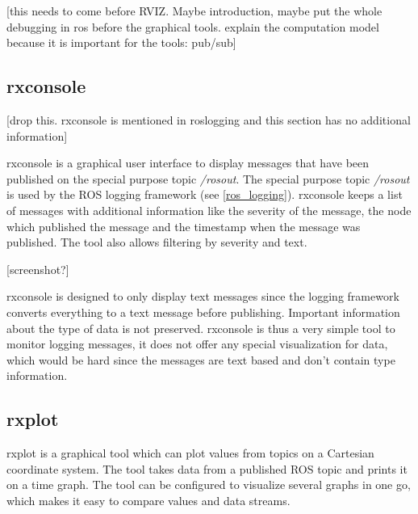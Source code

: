 [this needs to come before RVIZ. Maybe introduction, maybe put the whole debugging in ros before the graphical tools. explain the computation model because it is important for the tools: pub/sub]


\subsection{rxconsole}
[drop this. rxconsole is mentioned in roslogging and this section has no additional information]

rxconsole is a graphical user interface to display messages that have been published on the special purpose topic \emph{/rosout}. The special purpose topic \emph{/rosout} is used by the ROS logging framework (see \ref{ros_logging}). rxconsole keeps a list of messages with additional information like the severity of the message, the node which published the message and the timestamp when the message was published. The tool also allows filtering by severity and text.

[screenshot?]

rxconsole is designed to only display text messages since the logging framework converts everything to a text message before publishing. Important information about the type of data is not preserved. rxconsole is thus a very simple tool to monitor logging messages, it does not offer any special visualization for data, which would be hard since the messages are text based and don't contain type information.



\subsection{rxplot}
rxplot is a graphical tool which can plot values from topics on a Cartesian coordinate system. The tool takes data from a published ROS topic and prints it on a time graph. The tool can be configured to visualize several graphs in one go, which makes it easy to compare values and data streams.

